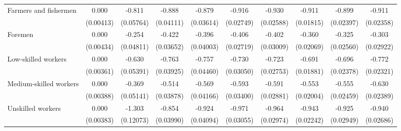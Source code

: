 {\begin{tabular}{l*{9}{c}}
Farmers and fishermen&       0.000         &      -0.811\sym{***}&      -0.888\sym{***}&      -0.879\sym{***}&      -0.916\sym{***}&      -0.930\sym{***}&      -0.911\sym{***}&      -0.899\sym{***}&      -0.911\sym{***}\\
                    &   (0.00413)         &   (0.05764)         &   (0.04111)         &   (0.03614)         &   (0.02749)         &   (0.02588)         &   (0.01815)         &   (0.02397)         &   (0.02358)         \\
Foremen             &       0.000         &      -0.254\sym{***}&      -0.422\sym{***}&      -0.396\sym{***}&      -0.406\sym{***}&      -0.402\sym{***}&      -0.360\sym{***}&      -0.325\sym{***}&      -0.303\sym{***}\\
                    &   (0.00434)         &   (0.04811)         &   (0.03652)         &   (0.04003)         &   (0.02719)         &   (0.03009)         &   (0.02069)         &   (0.02560)         &   (0.02922)         \\
Low-skilled workers &       0.000         &      -0.630\sym{***}&      -0.763\sym{***}&      -0.757\sym{***}&      -0.730\sym{***}&      -0.723\sym{***}&      -0.691\sym{***}&      -0.696\sym{***}&      -0.772\sym{***}\\
                    &   (0.00361)         &   (0.05391)         &   (0.03925)         &   (0.04460)         &   (0.03050)         &   (0.02753)         &   (0.01881)         &   (0.02378)         &   (0.02321)         \\
Medium-skilled workers&       0.000         &      -0.369\sym{***}&      -0.514\sym{***}&      -0.569\sym{***}&      -0.593\sym{***}&      -0.591\sym{***}&      -0.553\sym{***}&      -0.555\sym{***}&      -0.630\sym{***}\\
                    &   (0.00388)         &   (0.05141)         &   (0.03878)         &   (0.04166)         &   (0.03400)         &   (0.02881)         &   (0.02004)         &   (0.02459)         &   (0.02389)         \\
Unskilled workers   &       0.000         &      -1.303\sym{***}&      -0.854\sym{***}&      -0.924\sym{***}&      -0.971\sym{***}&      -0.964\sym{***}&      -0.943\sym{***}&      -0.925\sym{***}&      -0.940\sym{***}\\
                    &   (0.00383)         &   (0.12073)         &   (0.03990)         &   (0.04094)         &   (0.03055)         &   (0.02974)         &   (0.02242)         &   (0.02949)         &   (0.02686)         \\

\end{tabular}}
